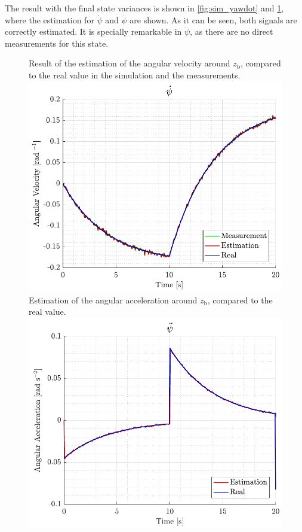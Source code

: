 The result with the final state variances is shown in \autoref{fig:sim_yawdot} and \ref{fig:sim_yawddot}, where the estimation for $\dot{\psi}$ and $\ddot{\psi}$ are shown. As it can be seen, both signals are correctly estimated. It is specially remarkable in $\ddot{\psi}$, as there are no direct measurements for this state.
\begin{figure}[H]
	\captionbox 
	{   
		Result of the estimation of the angular velocity around $z_\mathrm{b}$, compared to the real value in the simulation and the measurements.
		\label{fig:sim_yawdot}
	}                                                                 
	{                                                                  
		\includegraphics[width=.45\textwidth]{figures/sim_yawdot}         
	}                                                                    
	\hspace{5pt}                                                          
	\captionbox  
	{      
		Estimation of the angular acceleration around $z_\mathrm{b}$, compared to the real value.
		\label{fig:sim_yawddot}
	}                                                                          
	{
		\includegraphics[width=.45\textwidth]{figures/sim_yawddot}
	}
\end{figure}

